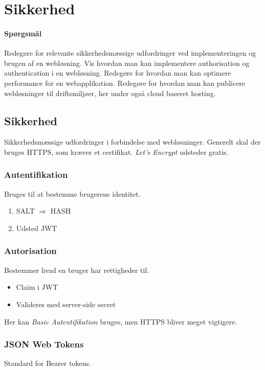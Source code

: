 \section{Sikkerhed}

\paragraph{Spørgsmål}
Redegøre for relevante sikkerhedsmæssige udfordringer ved implementeringen og brugen af en webløsning.	Vis hvordan man kan implementere authorisation og authentication i en webløsning.	Redegøre for hvordan man kan optimere performance for en webapplikation. Redegøre for hvordan man kan publicere webløsninger til driftsmiljøer, her under også cloud baseret hosting.

\subsection{Sikkerhed}
Sikkerhedsmæssige udfordringer i forbindelse med webløsninger. Generelt skal der bruges HTTPS, som kræver et certifikat. \textit{Let's Encrypt} udsteder gratis.

\begin{multicols}{2}
\subsubsection{Autentifikation} 
Bruges til at bestemme brugerens identitet. 

\begin{enumerate}
	\item SALT $\Rightarrow$ HASH
	\item Udsted JWT
\end{enumerate}

\subsubsection{Autorisation} 
Bestemmer hvad en bruger har rettigheder til.

\begin{itemize}
	\item Claim i JWT
	\item Valideres med server-side secret
\end{itemize}
\end{multicols}

Her kan \textit{Basic Autentifikation} bruges, men HTTPS bliver meget vigtigere.

\subsubsection{JSON Web Tokens}
Standard for Bearer tokens.

